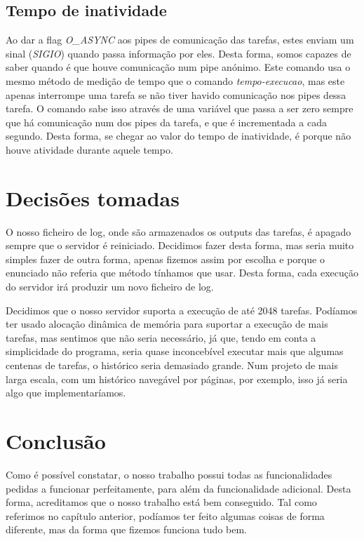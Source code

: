 \documentclass[a4paper]{report}
\begin{document}
	\section{Tempo de inatividade}
	Ao dar a flag \emph{O\_ASYNC} aos pipes de comunicação das tarefas, estes enviam um sinal (\emph{SIGIO}) quando passa informação por eles. Desta forma, somos capazes de saber quando é que houve comunicação num pipe anónimo. Este comando usa o mesmo método de medição de tempo que o comando \emph{tempo-execucao}, mas este apenas interrompe uma tarefa se não tiver havido comunicação nos pipes dessa tarefa. O comando sabe isso através de uma variável que passa a ser zero sempre que há comunicação num dos pipes da tarefa, e que é incrementada a cada segundo. Desta forma, se chegar ao valor do tempo de inatividade, é porque não houve atividade durante aquele tempo.
		
	\chapter{Decisões tomadas}
	
	O nosso ficheiro de log, onde são armazenados os outputs das tarefas, é apagado sempre que o servidor é reiniciado. Decidimos fazer desta forma, mas seria muito simples fazer de outra forma, apenas fizemos assim por escolha e porque o enunciado não referia que método tínhamos que usar. Desta forma, cada execução do servidor irá produzir um novo ficheiro de log.
	
	Decidimos que o nosso servidor suporta a execução de até 2048 tarefas. Podíamos ter usado alocação dinâmica de memória para suportar a execução de mais tarefas, mas sentimos que não seria necessário, já que, tendo em conta a simplicidade do programa, seria quase inconcebível executar mais que algumas centenas de tarefas, o histórico seria demasiado grande. Num projeto de mais larga escala, com um histórico navegável por páginas, por exemplo, isso já seria algo que implementaríamos.

	\chapter{Conclusão}
	
	Como é possível constatar, o nosso trabalho possui todas as funcionalidades pedidas a funcionar perfeitamente, para além da funcionalidade adicional. Desta forma, acreditamos que o nosso trabalho está bem conseguido. Tal como referimos no capítulo anterior, podíamos ter feito algumas coisas de forma diferente, mas da forma que fizemos funciona tudo bem.
\end{document}
